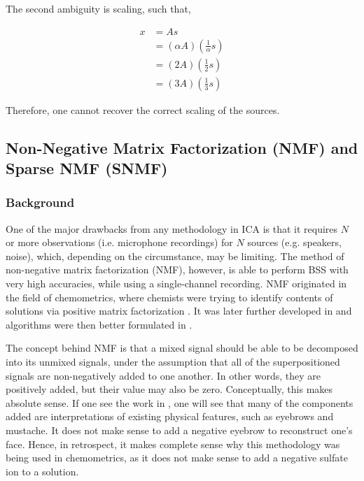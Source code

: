 The second ambiguity is scaling, such that,

\begin{align*}
    x &= As \\
    &= (\alpha A)\left( \frac{1}{\alpha} s\right) \\
    &= (2 A)\left( \frac{1}{2} s\right) \\
    &= (3 A)\left( \frac{1}{3} s\right)
\end{align*}

Therefore, one cannot recover the correct scaling of the sources.


\subsection{Non-Negative Matrix Factorization (NMF) and Sparse NMF (SNMF)} \label{sec:NMF}
\subsubsection{Background}
One of the major drawbacks from any methodology in ICA is that it requires $N$ or more observations (i.e. microphone recordings) for $N$ sources (e.g. speakers, noise), which, depending on the circumstance, may be limiting. The method of non-negative matrix factorization (NMF), however, is able to perform BSS with very high accuracies, while using a single-channel recording. NMF originated in the field of chemometrics, where chemists were trying to identify contents of solutions via positive matrix factorization \cite{pmf} \cite{pmf_chem}. It was later further developed in \cite{nmf1} and algorithms were then better formulated in \cite{nmf2}.

The concept behind NMF is that a mixed signal should be able to be decomposed into its unmixed signals, under the assumption that all of the superpositioned signals are non-negatively added to one another. In other words, they are positively added, but their value may also be zero. Conceptually, this makes absolute sense. If one see the work in \cite{nmf1}, one will see that many of the components added are interpretations of existing physical features, such as eyebrows and mustache. It does not make sense to add a negative eyebrow to reconstruct one's face. Hence, in retrospect, it makes complete sense why this methodology was being used in chemometrics, as it does not make sense to add a negative sulfate ion to a solution.

